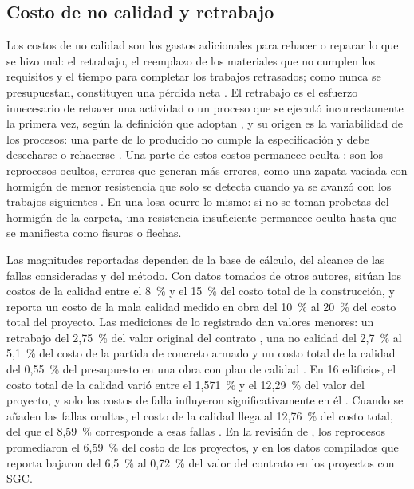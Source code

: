 \subsection{Costo de no calidad y retrabajo}

Los costos de no calidad son los gastos adicionales para rehacer o reparar lo que se hizo mal: el retrabajo, el reemplazo de los materiales que no cumplen los requisitos y el tiempo para completar los trabajos retrasados; como nunca se presupuestan, constituyen una pérdida neta \parencite[p.~38]{alfaro2011}. El retrabajo es el esfuerzo innecesario de rehacer una actividad o un proceso que se ejecutó incorrectamente la primera vez, según la definición que adoptan \textcite[p.~2]{forcada2017}, y su origen es la variabilidad de los procesos: una parte de lo producido no cumple la especificación y debe desecharse o rehacerse \parencite[p.~14]{koskela1992}. Una parte de estos costos permanece oculta \parencite[p.~5421]{khadim2023}: son los reprocesos ocultos, errores que generan más errores, como una zapata vaciada con hormigón de menor resistencia que solo se detecta cuando ya se avanzó con los trabajos siguientes \parencite[p.~19]{alvarez2014}. En una losa ocurre lo mismo: si no se toman probetas del hormigón de la carpeta, una resistencia insuficiente permanece oculta hasta que se manifiesta como fisuras o flechas.

Las magnitudes reportadas dependen de la base de cálculo, del alcance de las fallas consideradas y del método. Con datos tomados de otros autores, \textcite[p.~42]{dzul2009} sitúan los costos de la calidad entre el 8~\% y el 15~\% del costo total de la construcción, y \textcite[p.~35]{koskela1992} reporta un costo de la mala calidad medido en obra del 10~\% al 20~\% del costo total del proyecto. Las mediciones de lo registrado dan valores menores: un retrabajo del 2,75~\% del valor original del contrato \parencite[p.~8]{forcada2017}, una no calidad del 2,7~\% al 5,1~\% del costo de la partida de concreto armado \parencite[p.~1]{gudiel2020} y un costo total de la calidad del 0,55~\% del presupuesto en una obra con plan de calidad \parencite[p.~49]{muro2020}. En 16 edificios, el costo total de la calidad varió entre el 1,571~\% y el 12,29~\% del valor del proyecto, y solo los costos de falla influyeron significativamente en él \parencite[secciones~2.2 y 3.3]{palanisamy2025}. Cuando se añaden las fallas ocultas, el costo de la calidad llega al 12,76~\% del costo total, del que el 8,59~\% corresponde a esas fallas \parencite[pp.~5420--5423]{khadim2023}. En la revisión de \textcite[pp.~5, 12]{alvarez2014}, los reprocesos promediaron el 6,59~\% del costo de los proyectos, y en los datos compilados que reporta bajaron del 6,5~\% al 0,72~\% del valor del contrato en los proyectos con SGC.

